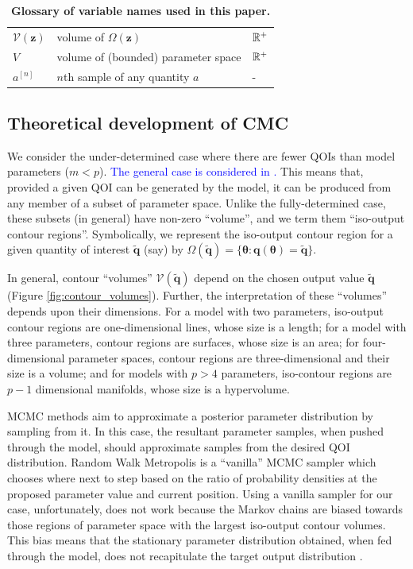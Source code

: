 \begin{table}[htbp]
\begin{adjustwidth}{-0.6in}{0in}
\begin{tabularx}{1.2\textwidth}{lll}
$\mathcal{V}(\boldsymbol{z})$         & volume of $\Omega(\boldsymbol{z})$                                 & $\mathbb{R}^+$ \\
$V$                                   & volume of (bounded) parameter space                                          & $\mathbb{R}^+$ \\
$a^{[n]}$ & $n$th sample of any quantity $a$ & -\\
\end{tabularx}
\caption{\textbf{Glossary of variable names used in this paper.}}
\label{tab:variable_glossary}
\end{adjustwidth}
\end{table}




\subsection{Theoretical development of CMC}
We consider the under-determined case where there are fewer QOIs than model parameters ($m<p$). \textcolor{blue}{The general case is considered in \cite{butler2014solving}.} This means that, provided a given QOI can be generated by the model, it can be produced from any member of a subset of parameter space. Unlike the fully-determined case, these subsets (in general) have non-zero ``volume'', and we term them ``iso-output contour regions''. Symbolically, we represent the iso-output contour region for a given quantity of interest $\tilde{\boldsymbol{q}}$ (say) by $\Omega(\tilde{\boldsymbol{q}}) = \{\boldsymbol{\theta}: \boldsymbol{q}(\boldsymbol{\theta}) = \tilde{\boldsymbol{q}}\}$.

In general,  contour ``volumes'' $\mathcal{V}(\tilde{\boldsymbol{q}})$  depend on the chosen output value $\tilde{\boldsymbol{q}}$ (Figure \ref{fig:contour_volumes}). Further, the interpretation of these ``volumes'' depends upon their dimensions. For a model with two parameters, iso-output contour regions are one-dimensional lines, whose size is a length; for a model with three parameters, contour regions are surfaces, whose size is an area; for four-dimensional parameter spaces, contour regions are three-dimensional and their size is a volume; and for models with $p>4$ parameters, iso-contour regions are $p-1$ dimensional manifolds, whose size is a hypervolume.

MCMC methods aim to approximate a posterior parameter distribution by sampling from it. In this case, the resultant parameter samples, when pushed through the model, should approximate samples from the desired QOI distribution. Random Walk Metropolis \cite{lambert2018Student} is a ``vanilla'' MCMC sampler which chooses where next to step based on the ratio of probability densities at the proposed parameter value and current position. Using a vanilla sampler for our case, unfortunately, does not work because the Markov chains are biased towards those regions of parameter space with the largest iso-output contour volumes. This bias means that the stationary parameter distribution obtained, when fed through the model, does not recapitulate the target output distribution \cite{lambert2018inverse}.

